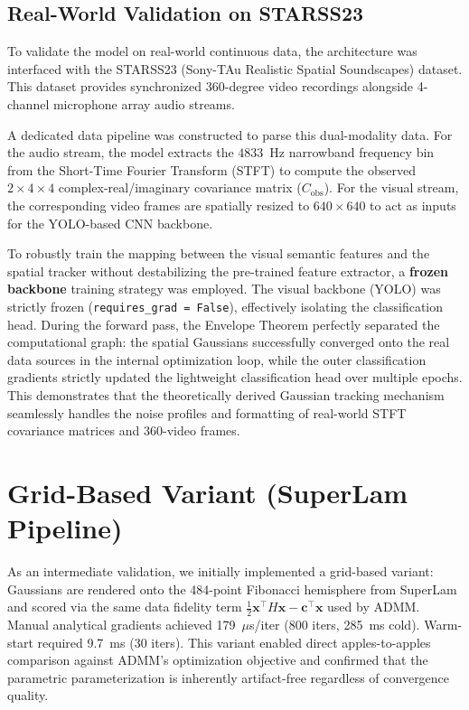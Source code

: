 \documentclass{article}
\begin{document}
\subsection{Real-World Validation on STARSS23}
To validate the model on real-world continuous data, the architecture was interfaced with the STARSS23 (Sony-TAu Realistic Spatial Soundscapes) dataset. This dataset provides synchronized 360-degree video recordings alongside 4-channel microphone array audio streams. 

A dedicated data pipeline was constructed to parse this dual-modality data. For the audio stream, the model extracts the $4833$~Hz narrowband frequency bin from the Short-Time Fourier Transform (STFT) to compute the observed $2 \times 4 \times 4$ complex-real/imaginary covariance matrix ($C_{\text{obs}}$). For the visual stream, the corresponding video frames are spatially resized to $640 \times 640$ to act as inputs for the YOLO-based CNN backbone.

To robustly train the mapping between the visual semantic features and the spatial tracker without destabilizing the pre-trained feature extractor, a \textbf{frozen backbone} training strategy was employed. The visual backbone (YOLO) was strictly frozen (\texttt{requires\_grad = False}), effectively isolating the classification head. During the forward pass, the Envelope Theorem perfectly separated the computational graph: the spatial Gaussians successfully converged onto the real data sources in the internal optimization loop, while the outer classification gradients strictly updated the lightweight classification head over multiple epochs. This demonstrates that the theoretically derived Gaussian tracking mechanism seamlessly handles the noise profiles and formatting of real-world STFT covariance matrices and 360-video frames.

\appendix

\section{Grid-Based Variant (SuperLam Pipeline)}
\label{sec:grid}

As an intermediate validation, we initially implemented a grid-based variant: Gaussians are rendered onto the 484-point Fibonacci hemisphere from SuperLam and scored via the same data fidelity term $\frac{1}{2}\mathbf{x}^\top H \mathbf{x} - \mathbf{c}^\top \mathbf{x}$ used by ADMM. Manual analytical gradients achieved 179~$\mu$s/iter (800 iters, 285~ms cold). Warm-start required 9.7~ms (30 iters). This variant enabled direct apples-to-apples comparison against ADMM's optimization objective and confirmed that the parametric parameterization is inherently artifact-free regardless of convergence quality.
\end{document}
